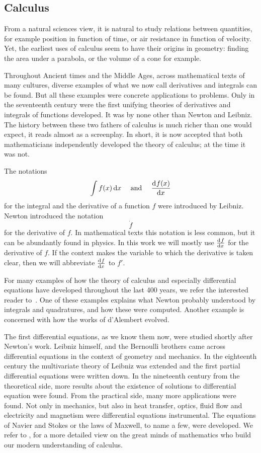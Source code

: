 \subsection{Calculus}

From a natural sciences view, it is natural to study relations between quantities, for example position in function of time, or air resistance in function of velocity. Yet, the earliest uses of calculus seem to have their origins in geometry: finding the area under a parabola, or the volume of a cone for example.

Throughout Ancient times and the Middle Ages, across mathematical texts of many cultures, diverse examples of what we now call derivatives and integrals can be found. But all these examples were concrete applications to problems. Only in the seventeenth century were the first unifying theories of derivatives and integrals of functions developed. It was by none other than Newton and Leibniz. The history between these two fathers of calculus is much richer than one would expect, it reads almost as a screenplay. In short, it is now accepted that both mathematicians independently developed the theory of calculus; at the time it was not.

The notations
$$
    \int f(x) \, \dd x \quad \text{ and } \quad \dv[]{f(x)}{x}
$$
for the integral and the derivative of a function $f$ were introduced by Leibniz. Newton introduced the notation
$$
    \dot{f}
$$
for the derivative of $f$. In mathematical texts this notation is less common, but it can be abundantly found in physics. In this work we will mostly use $\dv[]{f}{x}$ for the derivative of $f$. If the context makes the variable to which the derivative is taken clear, then we will abbreviate $\dv[]{f}{x}$ to $f'$.

For many examples of how the theory of calculus and especially differential equations have developed throughout the last 400 years, we refer the interested reader to~\cite{archibald_history_2005}. One of these examples explains what Newton probably understood by integrals and quadratures, and how these were computed. Another example is concerned with how the works of d'Alembert evolved.

The first differential equations, as we know them now, were studied shortly after Newton's work. Leibniz himself, and the Bernoulli brothers came across differential equations in the context of geometry and mechanics. In the eighteenth century the multivariate theory of Leibniz was extended and the first partial differential equations were written down. In the nineteenth century from the theoretical side, more results about the existence of solutions to differential equation were found. From the practical side, many more applications were found. Not only in mechanics, but also in heat transfer, optics, fluid flow and electricity and magnetism were differential equations instrumental. The equations of Navier and Stokes or the laws of Maxwell, to name a few, were developed. We refer to \cite{simmons_differential_2016}, for a more detailed view on the great minds of mathematics who build our modern understanding of calculus.

